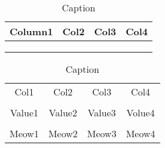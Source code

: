 \documentclass[11pt,letterpaper]{article} %
\begin{document}
\begin{table}
    \centering
    \begin{tabular}{|c|c|c|c|} \hline 
         Column1&  Col2&  Col3& Col4\\ \hline 
         &  &  & \\ \hline 
         &  &  & \\ \hline 
         &  &  & \\ \hline
    \end{tabular}
    \caption{Caption}
    \label{tab:my_label}
\end{table}


\begin{table}
    \centering
    \begin{tabular}{cccc}
         Col1&  Col2&  Col3& Col4\\
         \\
         Value1&  Value2&  Value3& Volue4\\
         &  &  & \\
         Meow1&  Meow2&  Meow3& Meow4\\
    \end{tabular}
    \caption{Caption}
    \label{tab:my_label}
\end{table}
\end{document}
